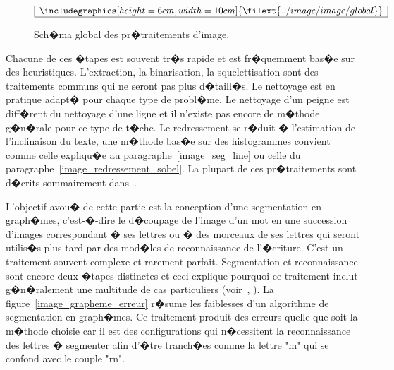             
            \begin{figure}[ht]
        $$\frame{$\begin{array}[c]{c}\includegraphics[height=6cm, width=10cm]
        {\filext{../image/image/global}}\end{array}$}$$
        \caption{Sch�ma global des pr�traitements d'image.}
        \label{image_global}
            \end{figure}
            
Chacune de ces �tapes est souvent tr�s rapide et est fr�quemment bas�e sur des heuristiques. L'extraction, la binarisation, la squelettisation sont des traitements communs qui ne seront pas plus d�taill�s. Le nettoyage est en pratique adapt� pour chaque type de probl�me. Le nettoyage d'un peigne est diff�rent du nettoyage d'une ligne et il n'existe pas encore de m�thode g�n�rale pour ce type de t�che. Le redressement se r�duit � l'estimation de l'inclinaison du texte, une m�thode bas�e sur des histogrammes convient comme celle expliqu�e au paragraphe~\ref{image_seg_line} ou celle du paragraphe~\ref{image_redressement_sobel}. La plupart de ces pr�traitements sont d�crits sommairement dans~.
            
L'objectif avou� de cette partie est la conception d'une segmentation en graph�mes, c'est-�-dire le d�coupage de l'image d'un mot en une succession d'images correspondant � ses lettres ou � des morceaux de ses lettres qui seront utilis�s plus tard par des mod�les de reconnaissance de l'�criture. C'est un traitement souvent complexe et rarement parfait. Segmentation et reconnaissance sont encore deux �tapes distinctes et ceci explique pourquoi ce traitement inclut g�n�ralement une multitude de cas particuliers (voir~, ). La figure~\ref{image_grapheme_erreur} r�sume les faiblesses d'un algorithme de segmentation en graph�mes. Ce traitement produit des erreurs quelle que soit la m�thode choisie car il est des configurations qui n�cessitent la reconnaissance des lettres � segmenter afin d'�tre tranch�es comme la lettre "m" qui se confond avec le couple "rn".
        
